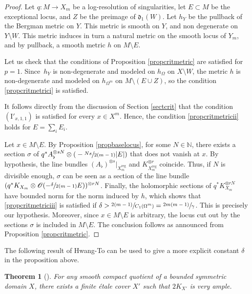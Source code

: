 \documentclass[JEP,XML,SOM,Unicode, NoEqCountersInSection,NoFloatCountersInSection,published]{cedram}
\let\mathcal\mathscr
\newcommand{\rI}{\mathrm{I}}
\newcommand{\reg}{\mathrm{reg}}
\theoremstyle{theorem}
\newtheorem{theorem}{Theorem}
\theoremstyle{definition}
\begin{document}
\begin{proof}
Let $q :M \to X_m$ be a log-resolution of singularities, let $E \subset M$ be the exceptional locus, and $Z$ be the preimage of $\mathfrak{d}_1(W)$. Let $h_Y$ be the pullback of the Bergman metric on $Y$. This metric is smooth on $Y$, and non degenerate on $Y \setminus W$. This metric induces in turn a natural metric on the smooth locus of $Y_m$, and by pullback, a smooth metric $h$ on $M\setminus E$.

Let us check that the conditions of Proposition \ref{propcritmetric} are satisfied for $p=1$. Since~$h_Y$ is non-degenerate and modeled on $h_\Omega$ on $X\setminus W$, the metric $h$ is non-degenerate and modeled on $h_{\Omega^m}$ on $M \setminus (E \cup Z)$, so the condition \eqref{propcritmetrici} is satisfied.

It follows directly from the discussion of Section \ref{sectcrit} that the condition $(\rI'_{x, 1, 1})$ is satisfied for every $x \in X^m$. Hence, the condition \eqref{propcritmetricii} holds for $E = \sum_i E_i$.

Let $x \in M \setminus E$. By Proposition \ref{propbaselocus}, for some $N \in \mathbb N$, there exists a section $\sigma$ of $q^\ast A_{\flat}^{\otimes s N} \otimes \mathcal ( - \sfrac{Ns}{2(m-1)} |E|)$ that does not vanish at $x$. By hypothesis, the line bundles $(A_\flat)^{\otimes s}|_{X_m^\reg}$ and $K_{X_m^\reg}^{\otimes r}$ coincide. Thus, if $N$ is divisible enough, $\sigma$ can be seen as a section of the line bundle $( q^\ast K_{X_m} \otimes \mathcal O( - \sfrac{\delta }{2(m-1)} E) )^{\otimes rN}$. Finally, the holomorphic sections of $q^\ast K_{X_m}^{\otimes r N}$ have bounded norm for the norm induced by $h$, which shows that \eqref{propcritmetriciii} is satisfied if $\delta > \sfrac{2(m-1)}{C_1(\Omega^m)} = \sfrac{2m(m-1)}{\gamma}$. This is precisely our hypothesis. Moreover, since $x \in M \setminus E$ is arbitrary, the locus cut out by the sections $\sigma$ is included in $M \setminus E$. The conclusion follows as announced from Proposition \ref{propcritmetric}.
\end{proof}

The following result of Hwang-To can be used to give a more explicit constant $\delta$ in the proposition above.

\begin{theorem}[\cite{HwT00}] For any smooth compact quotient of a bounded symmetric domain $X$, there exists a finite étale cover $X'$ such that $2 K_{X'}$ is very ample.
\end{theorem}
\end{document}
